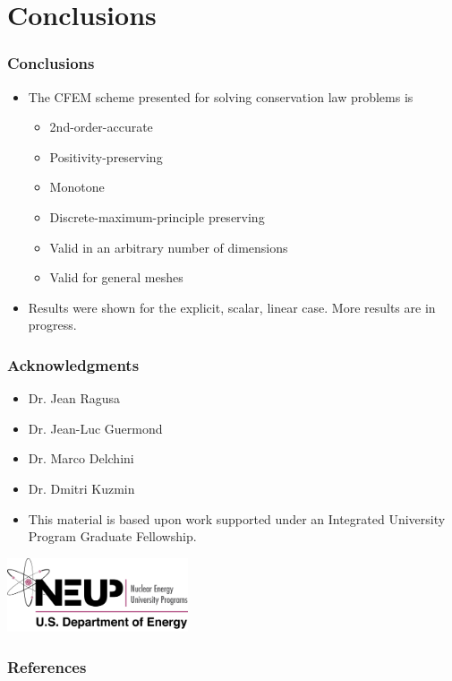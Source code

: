 \documentclass{beamer}
\begin{document}
\section{Conclusions}
\begin{frame}
\frametitle{Conclusions}

\begin{itemize}
   \item The CFEM scheme presented for solving conservation law problems is
   \begin{itemize}
      \item 2nd-order-accurate
      \item Positivity-preserving
      \item Monotone
      \item Discrete-maximum-principle preserving
      \item Valid in an arbitrary number of dimensions
      \item Valid for general meshes
   \end{itemize}
   \item Results were shown for the explicit, scalar, linear case. More results
      are in progress.
\end{itemize}

\end{frame}
\begin{frame}
\frametitle{Acknowledgments}

\begin{itemize}
   \item Dr. Jean Ragusa
   \item Dr. Jean-Luc Guermond
   \item Dr. Marco Delchini
   \item Dr. Dmitri Kuzmin
\end{itemize}
\begin{itemize}
   \item This material is based upon work supported under an Integrated University
      Program Graduate Fellowship.
\end{itemize}

\begin{center}
   \includegraphics[width=0.4\textwidth]{./figures/NEUP_Final_Logo_Version-09.jpg}
\end{center}
\end{frame}
\begin{frame}
\frametitle{References}




\end{frame}
\end{document}
